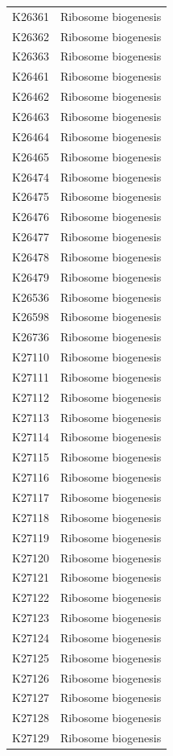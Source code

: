 \begin{longtable}{@{}l l@{}}
K26361 & Ribosome biogenesis \\
K26362 & Ribosome biogenesis \\
K26363 & Ribosome biogenesis \\
K26461 & Ribosome biogenesis \\
K26462 & Ribosome biogenesis \\
K26463 & Ribosome biogenesis \\
K26464 & Ribosome biogenesis \\
K26465 & Ribosome biogenesis \\
K26474 & Ribosome biogenesis \\
K26475 & Ribosome biogenesis \\
K26476 & Ribosome biogenesis \\
K26477 & Ribosome biogenesis \\
K26478 & Ribosome biogenesis \\
K26479 & Ribosome biogenesis \\
K26536 & Ribosome biogenesis \\
K26598 & Ribosome biogenesis \\
K26736 & Ribosome biogenesis \\
K27110 & Ribosome biogenesis \\
K27111 & Ribosome biogenesis \\
K27112 & Ribosome biogenesis \\
K27113 & Ribosome biogenesis \\
K27114 & Ribosome biogenesis \\
K27115 & Ribosome biogenesis \\
K27116 & Ribosome biogenesis \\
K27117 & Ribosome biogenesis \\
K27118 & Ribosome biogenesis \\
K27119 & Ribosome biogenesis \\
K27120 & Ribosome biogenesis \\
K27121 & Ribosome biogenesis \\
K27122 & Ribosome biogenesis \\
K27123 & Ribosome biogenesis \\
K27124 & Ribosome biogenesis \\
K27125 & Ribosome biogenesis \\
K27126 & Ribosome biogenesis \\
K27127 & Ribosome biogenesis \\
K27128 & Ribosome biogenesis \\
K27129 & Ribosome biogenesis \\

\end{longtable}
